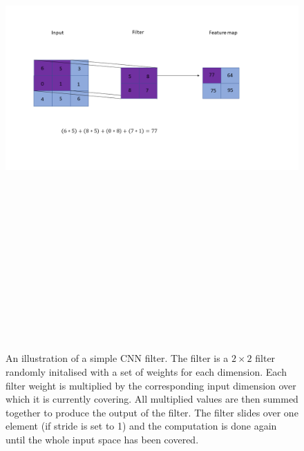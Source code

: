\begin{figure}
    \centering
    \includegraphics[width=17cm,height=20cm,keepaspectratio]{figures/cnn_filter_illustration.png}
    \caption{An illustration of a simple \ac{CNN} filter. The filter is a $2 \times 2$ filter randomly initalised with a set of weights for each dimension. Each filter weight is multiplied by the corresponding input dimension over which it is currently covering. All multiplied values are then summed together to produce the output of the filter. The filter slides over one element (if stride is set to 1) and the computation is done again until the whole input space has been covered.}
    \label{fig:cnn_filter_illustration}
\end{figure}

